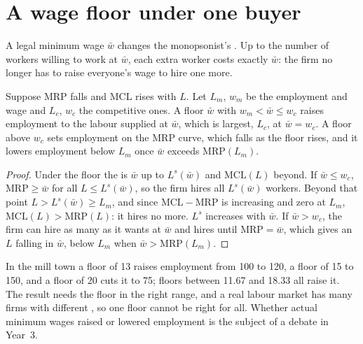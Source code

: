 \section{A wage floor under one buyer}\label{sec:b1:factor-markets:floor}

A legal minimum wage $\bar w$ changes the monopsonist's . Up to the number of workers willing to work at $\bar w$, each extra
worker costs exactly $\bar w$: the firm no longer has to raise everyone's wage
to hire one more.

\begin{proposition}\label{prop:b1:factor-markets:floor}
Suppose MRP falls and MCL rises with $L$. Let $L_m$, $w_m$ be the 
employment and wage and $L_c$, $w_c$ the competitive ones. A floor $\bar w$ with $w_m < \bar w \le w_c$ raises employment to the
labour supplied at $\bar w$, which is largest, $L_c$, at $\bar w = w_c$. A floor above
$w_c$ sets employment on the MRP curve, which falls as the floor rises, and
it lowers employment below $L_m$ once $\bar w$ exceeds $\mathrm{MRP}(L_m)$.
\end{proposition}

\begin{proof}
Under the floor the  is $\bar w$ up to $L^s(\bar w)$ and
$\mathrm{MCL}(L)$ beyond. If $\bar w \le w_c$, $\mathrm{MRP} \ge \bar w$ for all $L \le L^s(\bar w)$, so the firm hires
all $L^s(\bar w)$ workers. Beyond that point $L > L^s(\bar w) \ge L_m$, and since
$\mathrm{MCL} - \mathrm{MRP}$ is increasing and zero at $L_m$, $\mathrm{MCL}(L) > \mathrm{MRP}(L)$: it hires no
more. $L^s$ increases with $\bar w$. If $\bar w > w_c$, the firm can hire as many
as it wants at $\bar w$ and hires until $\mathrm{MRP} = \bar w$, which gives an $L$ falling in
$\bar w$, below $L_m$ when $\bar w > \mathrm{MRP}(L_m)$.
\end{proof}

In the mill town a floor of 13 raises employment from 100 to 120, a floor of
15 to 150, and a floor of 20 cuts it to 75; floors between 11.67 and 18.33
all raise it. The result needs the floor in the right range, and a real
labour market has many firms with different , so one floor cannot
be right for all. Whether actual minimum wages raised or lowered employment
is the subject of a debate in Year~3.


